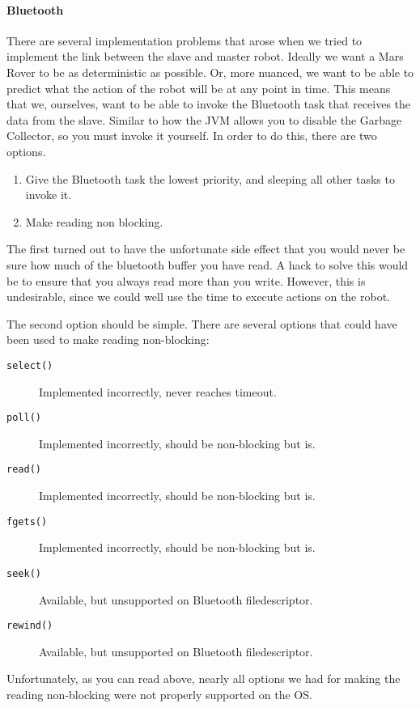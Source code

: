 \documentclass{scrartcl}
\begin{document}
\paragraph{Bluetooth}
There are several implementation problems that arose when we tried to implement the link between the slave and master robot.
Ideally we want a Mars Rover to be as deterministic as possible.
Or, more nuanced, we want to be able to predict what the action of the robot will be at any point in time.
This means that we, ourselves, want to be able to invoke the Bluetooth task that receives the data from the slave.
Similar to how the JVM allows you to disable the Garbage Collector, so you must invoke it yourself.
In order to do this, there are two options.
\begin{enumerate}
	\item Give the Bluetooth task the lowest priority, and sleeping all other tasks to invoke it.
	\item Make reading non blocking.
\end{enumerate}

The first turned out to have the unfortunate side effect that you would never be sure how much of the bluetooth buffer you have read.
A hack to solve this would be to ensure that you always read more than you write.
However, this is undesirable, since we could well use the time to execute actions on the robot.

The second option should be simple.
There are several options that could have been used to make reading non-blocking:
\begin{description}
	\item[\texttt{select()}] Implemented incorrectly, never reaches timeout.
	\item[\texttt{poll()}] Implemented incorrectly, should be non-blocking but is.
	\item[\texttt{read()}] Implemented incorrectly, should be non-blocking but is.
	\item[\texttt{fgets()}] Implemented incorrectly, should be non-blocking but is.
	\item[\texttt{seek()}] Available, but unsupported on Bluetooth filedescriptor.
	\item[\texttt{rewind()}] Available, but unsupported on Bluetooth filedescriptor.
\end{description}
Unfortunately, as you can read above, nearly all options we had for making the reading non-blocking were not properly supported on the OS.
\end{document}
